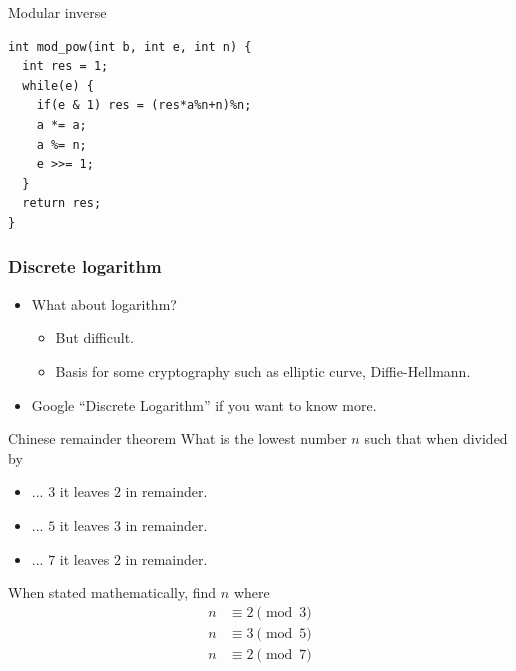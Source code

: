 \documentclass{beamer}
\begin{document}
\begin{frame}{Modular inverse}
    \begin{verbatim}
int mod_pow(int b, int e, int n) {
  int res = 1; 
  while(e) {
    if(e & 1) res = (res*a%n+n)%n;
    a *= a; 
    a %= n; 
    e >>= 1; 
  }
  return res; 
}
\end{verbatim}
\end{frame}

\begin{frame}[plain]
  \frametitle{Discrete logarithm}
  \vspace{30pt}
  \begin{itemize}
    \item What about logarithm? 
      \begin{itemize}
        \item But difficult.
        \item Basis for some cryptography such as elliptic curve, Diffie-Hellmann.
      \end{itemize}
    \item Google ``Discrete Logarithm'' if you want to know more.
  \end{itemize}
\end{frame}



\begin{frame}[plain]{Chinese remainder theorem}
  \vspace{20pt}
  What is the lowest number $n$ such that when divided by
  \vspace{10pt}
  \begin{itemize}
    \item[] ... $3$ it leaves $2$ in remainder.
    \item[] ... $5$ it leaves $3$ in remainder.
    \item[] ... $7$ it leaves $2$ in remainder.
  \end{itemize}
  \vspace{10pt}
  When stated mathematically, find $n$ where
      \begin{align*}
  n &\equiv 2 \pmod{3} \\
  n &\equiv 3 \pmod{5} \\
  n &\equiv 2 \pmod{7}
      \end{align*}
\end{frame}
\end{document}
